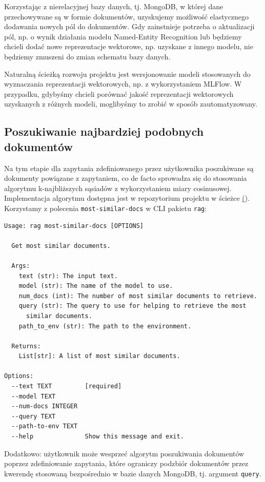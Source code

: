 \documentclass[10pt]{article}
\begin{document}
Korzystając z nierelacyjnej bazy danych, tj. MongoDB, w której dane przechowywane są w formie dokumentów, uzyskujemy możliwość elastycznego dodawania nowych pól do dokumentów. Gdy zainstnieje potrzeba o aktualizacji pól, np. o wynik działania modelu Named-Entity Recognition lub będziemy chcieli dodać nowe reprezentacje wektorowe, np. uzyskane z innego modelu, nie będziemy zmuszeni do zmian schematu bazy danych.

Naturalną ścieżką rozwoju projektu jest wersjonowanie modeli stosowanych do wyznaczania reprezentacji wektorowych, np. z wykorzystaniem MLFlow. W przypadku, gdybyśmy chcieli porównać jakość reprezentacji wektorowych uzyskanych z różnych modeli, moglibyśmy to zrobić w sposób zautomatyzowany.

\subsection{Poszukiwanie najbardziej podobnych dokumentów}

Na tym etapie dla zapytania zdefiniowanego przez użytkownika poszukiwane są dokumenty powiązane z zapytaniem, co de facto sprowadza się do stosowania algorytmu k-najbliższych sąsiadów z wykorzystaniem miary cosinusowej. Implementacja algorytmu dostępna jest w repozytorium projektu w ścieżce \href{https://github.com/stasulam/pw-big-data-thesis-public/blob/main/src/rag/processor/most_similar_docs.py}(). Korzystamy z polecenia \texttt{most-similar-docs} w CLI pakietu \texttt{rag}:

\begin{lstlisting}
Usage: rag most-similar-docs [OPTIONS]

  Get most similar documents.

  Args:
    text (str): The input text.
    model (str): The name of the model to use.
    num_docs (int): The number of most similar documents to retrieve.
    query (str): The query to use for helping to retrieve the most 
      similar documents.
    path_to_env (str): The path to the environment.

  Returns:
    List[str]: A list of most similar documents.

Options:
  --text TEXT         [required]
  --model TEXT
  --num-docs INTEGER
  --query TEXT
  --path-to-env TEXT
  --help              Show this message and exit.
\end{lstlisting}

Dodatkowo: użytkownik może wesprzeć algorytm poszukiwania dokumentów poprzez zdefiniowanie zapytania, które ograniczy podzbiór dokumentów przez kwerendę stosowaną bezpośrednio w bazie danych MongoDB, tj. argument \texttt{query}.
\end{document}
